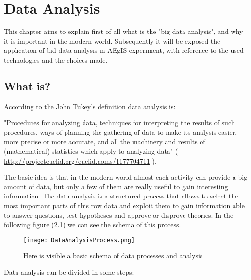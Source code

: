 
\chapter{Data Analysis} %

\label{Chapter2} %


This chapter aims to explain first of all what is the "big data analysis", and why it is important in the modern world. Subsequently it will be exposed the application of bid data analysis in AEgIS experiment, with reference to the used technologies and the choices made.   


\section{What is?}
According to the John Tukey's definition data analysis is: 

"Procedures for analyzing data, techniques for interpreting the results of such procedures, ways of planning the gathering of data to make its analysis easier, more precise or more accurate, and all the machinery and results of (mathematical) statistics which apply to analyzing data" 
( \url{http://projecteuclid.org/euclid.aoms/1177704711} ).

The basic idea is that in the modern world almost each activity can provide a big amount of data, but only a few of them are really useful to gain interesting information. The data analysis is a structured process that allows to select the most important parts of this row data and exploit them to gain information able to answer questions, test hypotheses and approve or disprove theories.
In the following figure (2.1) we can see the schema of this process. 

\begin{figure}[H]
\centering
\texttt{[image: DataAnalysisProcess.png]} 
\caption{Here is visible a basic schema of data processes and analysis}
\end{figure}

Data analysis can be divided in some steps:

